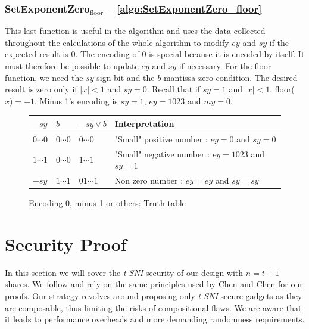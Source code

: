 \documentclass[runningheads]{llncs}
\begin{document}
    \subsubsection{SetExponentZero$_\text{floor}$ -- \autoref{algo:SetExponentZero_floor}}

    This last function is useful in the algorithm and uses the data collected throughout the calculations of the whole algorithm to modify $ey$ and $sy$ if the expected result is 0.
      The encoding of $0$ is special because it is encoded by itself. It must therefore be possible to update $ey$ and $sy$ if necessary. 
      For the floor function, we need the $sy$ sign bit and the $b$ mantissa zero condition.
      The desired result is zero only if $\mid x \mid <1$ and $sy=0$. Recall that if $sy=1$ and $\mid x \mid <1$, floor($x)=-1$. 
      Minus 1's encoding is $sy = 1$, $ey = 1023$ and $my = 0$.

      \begin{figure}
        \begin{center}
            \begin{tabular}{C{1.2cm} C{1.2cm} || C{2 cm} C{7.5cm}}
                \toprule
                 $-sy$ & $b$ &$-sy \vee b$ & Interpretation\\
                \midrule
                $0\cdots0$ & $0\cdots0$ & $0\cdots0$ & "Small" positive number : $ey = 0$ and $sy = 0$  \\
                $1\cdots1$ & $0\cdots0$ & $1\cdots1$ & "Small" negative number : $ey = 1023$ and $sy = 1$\\ 
                $-sy$ & $1\cdots1$ & $01\cdots1$ & Non zero number : $ey = ey$ and $sy=sy$\\
                \bottomrule
            \end{tabular}
        \end{center}
        \caption{Encoding 0, minus 1 or others: Truth table}
        \label{figure:flooradjust2}
    \end{figure}

\section{Security Proof}\label{sec:security}
In this section we will cover the \emph{t-SNI} security of our design with $n=t+1$ shares. We follow and rely on the same principles used by Chen and Chen \cite{Chen_Chen_2024} for our proofs. Our strategy revolves around proposing only \emph{t-SNI} secure gadgets as they are composable, thus limiting the risks of compositional flaws. We are aware that it leads to performance overheads and more demanding randomness requirements.
\end{document}
